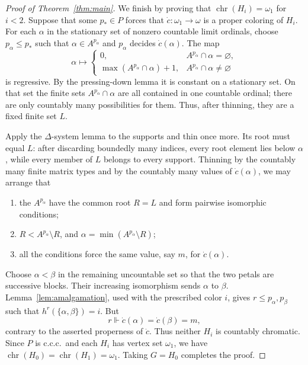 \documentclass{amsart}
\numberwithin{equation}{section}
\theoremstyle{definition}
\theoremstyle{remark}
\newcommand{\chr}{\operatorname{chr}}
\begin{document}
\begin{proof}[Proof of Theorem~\ref{thm:main}]
We finish by proving that $\chr(H_i)=\omega_1$ for $i<2$.  Suppose
that some $p_*\in P$ forces that
$\dot c:\omega_1\to\omega$ is a proper coloring of $H_i$.  For each
$\alpha$ in the stationary set of nonzero countable limit ordinals,
choose $p_\alpha\leq p_*$ such that $\alpha\in A^{p_\alpha}$ and
$p_\alpha$ decides $\dot c(\alpha)$.  The map
\begin{displaymath}
 \alpha\longmapsto
 \begin{cases}
 0,&A^{p_\alpha}\cap\alpha=\varnothing,\\
 \max(A^{p_\alpha}\cap\alpha)+1,&A^{p_\alpha}\cap\alpha\ne\varnothing
 \end{cases}
\end{displaymath}
is regressive.  By the pressing-down lemma it is constant on a
stationary set.  On that set the finite sets
$A^{p_\alpha}\cap\alpha$ are all contained in one countable ordinal;
there are only countably many possibilities for them.  Thus, after
thinning, they are a fixed finite set $L$.

Apply the $\Delta$-system lemma to the supports and thin once more.
Its root must equal $L$: after discarding boundedly many indices, every
root element lies below $\alpha$, while every member of $L$ belongs to
every support.  Thinning by the countably many finite matrix types and
by the countably many values of $\dot c(\alpha)$, we may arrange that
\begin{enumerate}
\item the $A^{p_\alpha}$ have the common root $R=L$ and form pairwise
isomorphic conditions;
\item $R<A^{p_\alpha}\setminus R$, and
$\alpha=\min(A^{p_\alpha}\setminus R)$;
\item all the conditions force the same value, say $m$, for
$\dot c(\alpha)$.
\end{enumerate}
Choose $\alpha<\beta$ in the remaining uncountable set so that the two
petals are successive blocks.  Their increasing isomorphism sends
$\alpha$ to $\beta$.  Lemma~\ref{lem:amalgamation}, used with the
prescribed color $i$, gives $r\leq p_\alpha,p_\beta$ such that
$h^r(\{\alpha,\beta\})=i$.  But
\begin{displaymath}
 r\Vdash \dot c(\alpha)=\dot c(\beta)=m,
\end{displaymath}
contrary to the asserted properness of $\dot c$.  Thus neither $H_i$
is countably chromatic.  Since $P$ is c.c.c.\ and each $H_i$ has vertex
set $\omega_1$, we have
$\chr(H_0)=\chr(H_1)=\omega_1$.  Taking $G=H_0$ completes the proof.
\end{proof}
\end{document}
